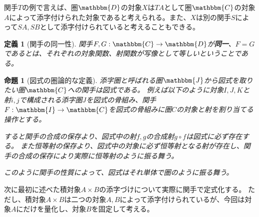 \documentclass[uplatex,dvipdfmx]{jsarticle}
\newcommand{\cat}[1]{\mathbbm{#1}}
\newcommand{\arrow}{\rightarrow}
\newcommand{\functor}[3]{#1:\cat{#2}\arrow \cat{#3}}
\newtheorem{prop}[proof]{命題}
\newtheorem{define}[proof]{定義}
\numberwithin{proof}{subsection}
\begin{document}
  関手$T$の例で言えば、圏$\cat{D}$の対象$X$は$TA$として圏$\cat{C}$の対象$A$によって添字付けられた対象であると考えられる。また、$X$は別の関手$S$によって$SA,SB$として添字付けられていると考えることもできる。

	\begin{define}[関手の同一性]
		関手$\functor{F,G}{C}{D}$が\textbf{同一}、$F=G$であるとは、それぞれの対象関数、射関数が写像として等しいということである。
	\end{define}


	\begin{prop}[図式の圏論的な定義]
		添字圏と呼ばれる圏$\cat{J}$から図式を取りたい圏$\cat{C}$への関手は図式である。
		例えば以下のように対象$I,J,K$と射$i,j$で構成される添字圏$J$を図式の骨組み、関手$\functor{F}{I}{C}$を図式の骨組みに圏$C$の対象と射を割り当てる操作とする。

		すると関手の合成の保存より、図式中の射$f,g$の合成射$g\circ f$は図式に必ず存在する。
    また恒等射の保存より、図式中の対象に必ず恒等射となる射が存在し、関手の合成の保存により実際に恒等射のように振る舞う。

    このように関手の性質によって、図式はそれ単体で圏のように振る舞う。
		\begin{center}
		\end{center}
	\end{prop}
  次に最初に述べた積対象$A\times B$の添字づけについて実際に関手で定式化する。
  ただし、積対象$A\times B$は二つの対象$A,B$によって添字付けられているが、今回は対象$A$にだけを量化し、対象$B$を固定して考える。
\end{document}
